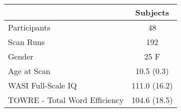 \begin{tabular}{lc}
\toprule 
 & Subjects \\ 
\midrule 
Participants & 48 \\ 
Scan Runs & 192 \\ 
Gender  &  25 F \\ 
Age at Scan &  10.5 (0.3)  \\ 
WASI Full-Scale IQ  & 111.0 (16.2) \\ 
TOWRE - Total Word Efficiency & 104.6 (18.5) \\ 
\bottomrule 
\end{tabular}